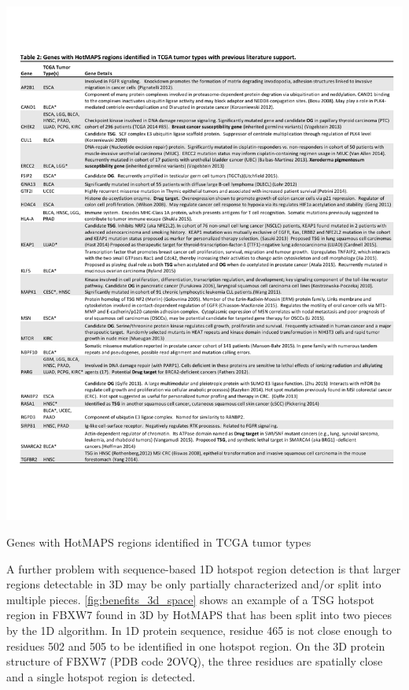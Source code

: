 \begin{table}
  \centering
  \makeatletter
  \let\@currsize\normalsize
  \includegraphics[width=\linewidth]{tables/chapter5/HotMAPS_second_table.pdf}
  \caption[3D HotMAPS regions with supportive evidence]{Genes with HotMAPS regions identified in TCGA tumor types}
  \label{tab:hotmaps_second}
\end{table}

A further problem with sequence-based 1D hotspot region detection is that larger regions detectable in 3D may be only partially characterized and/or split into multiple pieces. \autoref{fig:benefits_3d_space} shows an example of a TSG hotspot region in FBXW7 found in 3D by HotMAPS that has been split into two pieces by the 1D algorithm. In 1D protein sequence, residue 465 is not close enough to residues 502 and 505 to be identified in one hotspot region. On the 3D protein structure of FBXW7 (PDB code 2OVQ), the three residues are spatially close and a single hotspot region is detected.

